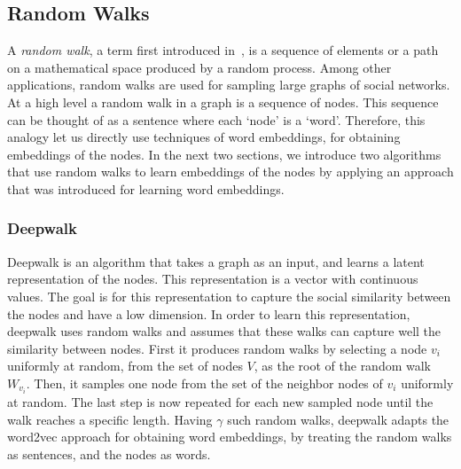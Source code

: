 \subsection{Random Walks}

A \emph{random walk}, a term first introduced in~\cite{pearson1905problem},
is a sequence of elements or a path on a mathematical space
produced by a random process. Among other applications, random walks are used
for sampling large graphs of social networks.
At a high level a random walk in a graph is a sequence of nodes. This sequence
can be thought of as a sentence where each `node' is a `word'. Therefore, this
analogy let us directly use techniques of word embeddings, for obtaining
embeddings of the nodes. In the next two sections, we introduce
two algorithms that use random walks to learn embeddings of the nodes
by applying an approach that was introduced for learning word embeddings.

\subsubsection{Deepwalk}

Deepwalk is an algorithm that takes a graph as an input, and learns a latent
representation of the nodes. This representation is a vector with continuous
values. The goal is for this representation to capture the social similarity
between the nodes and have a low dimension. In order to learn this
representation, deepwalk uses random walks and assumes that these walks can
capture well the similarity between nodes. First it produces random walks by
selecting a node $v_i$ uniformly at random, from the set of nodes $V$, as the
root of the random walk $W_{v_i}$. Then, it samples one node from the set of the
neighbor nodes of $v_i$ uniformly at random. The last step is now repeated for
each new sampled node until the walk reaches a specific length. Having $\gamma$
such random walks, deepwalk adapts the word2vec approach for obtaining word
embeddings, by treating the random walks as sentences, and the nodes as words.

